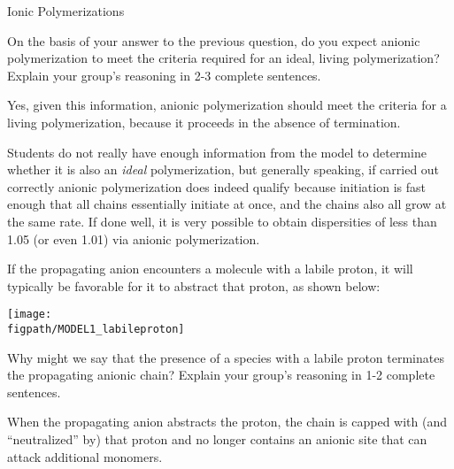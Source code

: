 \begin{activity}{Ionic Polymerizations}
\begin{ctqs}
	\question On the basis of your answer to the previous question, do you expect anionic polymerization to meet the criteria required for an ideal, living polymerization?  Explain your group's reasoning in 2-3 complete sentences.
	
		\begin{solution}[1.25in]
			Yes, given this information, anionic polymerization should meet the criteria for a living polymerization, because it proceeds in the absence of termination.
			
			Students do not really have enough information from the model to determine whether it is also an \textit{ideal} polymerization, but generally speaking, if carried out correctly anionic polymerization does indeed qualify because initiation is fast enough that all chains essentially initiate at once, and the chains also all grow at the same rate.  If done well, it is very possible to obtain dispersities of less than 1.05 (or even 1.01) via anionic polymerization.
		\end{solution}

\end{ctqs}

\begin{infobox}

	If the propagating anion encounters a molecule with a labile proton, it will typically be favorable for it to abstract that proton, as shown below:
	
	\centerline{\texttt{[image: \\figpath/MODEL1\_labileproton]}}
	
\end{infobox}

\begin{ctqs}
	
	
	\question Why might we say that the presence of a species with a labile proton terminates the propagating anionic chain?  Explain your group's reasoning in 1-2 complete sentences.
	
		\begin{solution}[1in]
			When the propagating anion abstracts the proton, the chain is capped with (and ``neutralized'' by) that proton and no longer contains an anionic site that can attack additional monomers.
		\end{solution}
	

\end{ctqs}
\end{activity}
